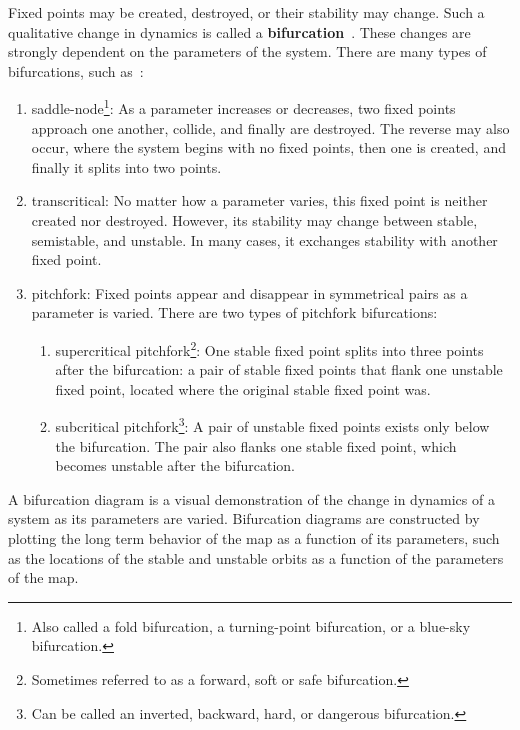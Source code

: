 Fixed points may be created, destroyed, or their stability may
change. Such a qualitative change in dynamics is called a \textbf{bifurcation}~\cite{strogatz}. These changes are strongly dependent on the
parameters of the system. There are many types of
bifurcations, such as~\cite{strogatz}: 
\begin{enumerate}
\item saddle-node\footnote{Also called a fold bifurcation, a
    turning-point bifurcation, or a blue-sky bifurcation.}: As a parameter increases or decreases, two fixed
  points approach one another, collide, and finally are destroyed. The
  reverse may also occur, where the system begins with no fixed
  points, then one is created, and finally it splits into two points. 
\item transcritical: No matter how a parameter varies, this fixed
  point is neither created nor destroyed. However, its stability may
  change between stable, semistable, and unstable. In many cases, it
  exchanges stability with another fixed point. 
\item pitchfork: Fixed points appear and disappear in
  symmetrical pairs as a parameter is varied. There are two types of
  pitchfork bifurcations:
\begin{enumerate} 
\item supercritical pitchfork\footnote{Sometimes referred to as a
    forward, soft or safe bifurcation.}: One stable fixed point splits into
  three points after the bifurcation: a pair
  of stable fixed points that flank one unstable fixed point, located
  where the original stable fixed point was. 
\item subcritical pitchfork\footnote{Can be called an inverted,
    backward, hard, or dangerous bifurcation.}: A pair of unstable fixed points exists only below
  the bifurcation. The pair also flanks one stable fixed point, which
  becomes unstable after the bifurcation.
\end{enumerate}
\end{enumerate}
A bifurcation diagram is a
visual demonstration of the change in dynamics of a system as its
parameters are varied. Bifurcation diagrams are constructed by
plotting the long term behavior of the map as a function of its
parameters, such as the locations of the stable and unstable orbits as
a function of the parameters of the map. 

